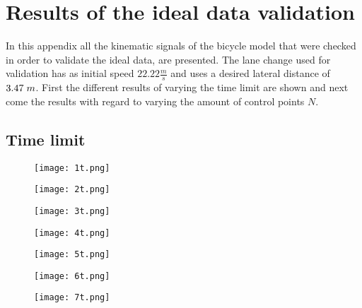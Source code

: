 \chapter{Results of the ideal data validation}
\label{app:B}

In this appendix all the kinematic signals of the bicycle model that were checked in order to validate the ideal data, are presented. The lane change used for validation has as initial speed $22.22 \frac{m}{s}$ and uses a desired lateral distance of $3.47 \hspace{1mm}m$. First the different results of varying the time limit are shown and next come the results with regard to varying the amount of control points $N$.


\section{Time limit}

\begin{figure}[h!]
	\centering
	\texttt{[image: 1t.png]}
	\label{fig:lat_acc_val}
\end{figure}


\begin{figure}[h!]
	\centering
	\texttt{[image: 2t.png]}
	\label{fig:lat_acc_val}
\end{figure}

\begin{figure}[h!]
	\centering
	\texttt{[image: 3t.png]}
	\label{fig:lat_acc_val}
\end{figure}


\begin{figure}[h!]
	\centering
	\texttt{[image: 4t.png]}
	\label{fig:lat_acc_val}
\end{figure}


\begin{figure}[h!]
	\centering
	\texttt{[image: 5t.png]}
	\label{fig:lat_acc_val}
\end{figure}


\begin{figure}[h!]
	\centering
	\texttt{[image: 6t.png]}
	\label{fig:lat_acc_val}
\end{figure}


\begin{figure}[h!]
	\centering
	\texttt{[image: 7t.png]}
	\label{fig:lat_acc_val}
\end{figure}


